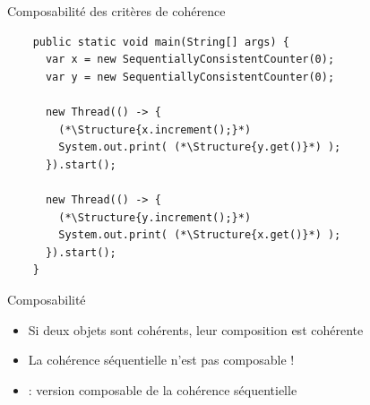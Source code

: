 
\begingroup

\begin{frame}[fragile]{Composabilité des critères de cohérence}

  \begin{lstlisting}
    public static void main(String[] args) {    
      var x = new SequentiallyConsistentCounter(0);
      var y = new SequentiallyConsistentCounter(0);
      
      new Thread(() -> {
        (*\Structure{x.increment();}*)
        System.out.print( (*\Structure{y.get()}*) );
      }).start();
      
      new Thread(() -> {
        (*\Structure{y.increment();}*)
        System.out.print( (*\Structure{x.get()}*) );
      }).start();
    }
  \end{lstlisting}

  \begin{center}
  \end{center}

  \pause

  \begin{block}{Composabilité}
    \begin{itemize}
    \item Si deux objets sont cohérents, leur composition est cohérente 
    \item \alert{La cohérence séquentielle n'est pas composable !}
    \item {} : version composable de la cohérence séquentielle
    \end{itemize}
  \end{block}

\end{frame}

\endgroup
\endinput
